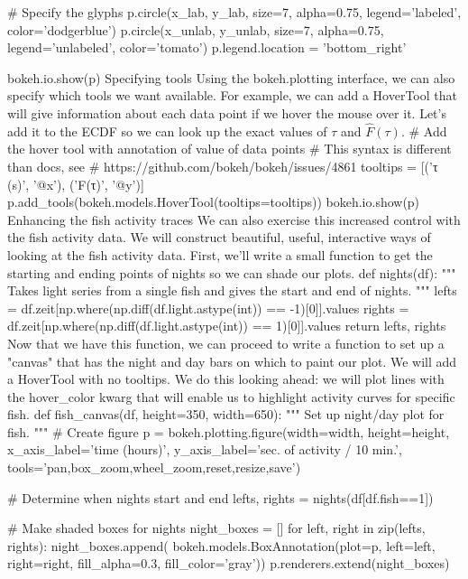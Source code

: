# Specify the glyphs
p.circle(x_lab, y_lab, size=7, alpha=0.75, legend='labeled',
         color='dodgerblue')
p.circle(x_unlab, y_unlab, size=7, alpha=0.75, legend='unlabeled',
         color='tomato')
p.legend.location = 'bottom_right'

bokeh.io.show(p)
Specifying tools
Using the bokeh.plotting interface, we can also specify which tools we want available. For example, we can add a HoverTool that will give information about each data point if we hover the mouse over it. Let's add it to the ECDF so we can look up the exact values of $\tau$ and $\hat{F}(\tau)$.
# Add the hover tool with annotation of value of data points
# This syntax is different than docs, see 
# https://github.com/bokeh/bokeh/issues/4861
tooltips = [('τ (s)', '@x'), ('F(τ)', '@y')]
p.add_tools(bokeh.models.HoverTool(tooltips=tooltips))
bokeh.io.show(p)
Enhancing the fish activity traces
We can also exercise this increased control with the fish activity data. We will construct beautiful, useful, interactive ways of looking at the fish activity data. First, we'll write a small function to get the starting and ending points of nights so we can shade our plots.
def nights(df):
    """
    Takes light series from a single fish and gives the start and end of nights.
    """
    lefts = df.zeit[np.where(np.diff(df.light.astype(int)) == -1)[0]].values
    rights = df.zeit[np.where(np.diff(df.light.astype(int)) == 1)[0]].values
    return lefts, rights
Now that we have this function, we can proceed to write a function to set up a "canvas" that has the night and day bars on which to paint our plot. We will add a HoverTool with no tooltips. We do this looking ahead: we will plot lines with the hover_color kwarg that will enable us to highlight activity curves for specific fish.
def fish_canvas(df, height=350, width=650):
    """
    Set up night/day plot for fish.
    """  
    # Create figure
    p = bokeh.plotting.figure(width=width, height=height, 
                              x_axis_label='time (hours)',
                              y_axis_label='sec. of activity / 10 min.',
                              tools='pan,box_zoom,wheel_zoom,reset,resize,save')

    # Determine when nights start and end
    lefts, rights = nights(df[df.fish==1])

    # Make shaded boxes for nights
    night_boxes = []
    for left, right in zip(lefts, rights):
        night_boxes.append(
                bokeh.models.BoxAnnotation(plot=p, left=left, right=right, 
                                           fill_alpha=0.3, fill_color='gray'))
    p.renderers.extend(night_boxes)
    
